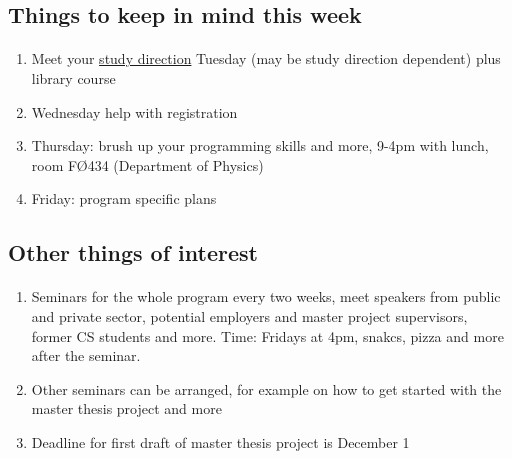\documentclass[%
oneside,                 %
final,                   %
10pt]{article}
\begin{document}
\noindent



\subsection{Things to keep in mind this week}

\paragraph{}
\begin{enumerate}
\item Meet your \href{{https://www.mn.uio.no/fysikk/english/studies/master/welcomeweek/index.html}}{study direction} Tuesday (may be study direction dependent) plus library course

\item Wednesday help with registration

\item Thursday: brush up your programming skills and more, 9-4pm with lunch, room FØ434 (Department of Physics)

\item Friday: program specific plans
\end{enumerate}

\noindent



\subsection{Other things of interest}


\paragraph{}
\begin{enumerate}
\item Seminars for the whole program every two weeks, meet speakers from public and private sector, potential employers and master project supervisors, former CS students and more. Time: Fridays at 4pm, snakcs, pizza and more after the seminar.

\item Other seminars can be arranged, for example on how to get started with the master thesis project and more

\item Deadline for first draft of master thesis project is December 1
\end{enumerate}
\end{document}
